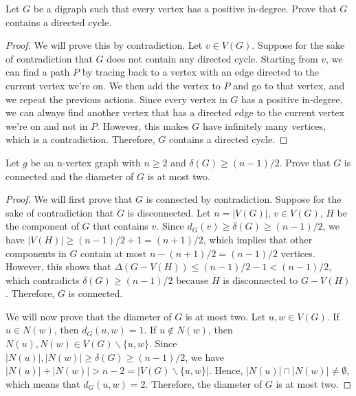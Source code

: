 \documentclass{article}
\newenvironment{problem}[2][Problem]{\begin{trivlist}
\item[\hskip \labelsep {\bfseries #1}\hskip \labelsep {\bfseries #2.}]}{\end{trivlist}}
\begin{document}
\begin{problem}{1.7.4}
    Let $G$ be a digraph such that every vertex has a positive in-degree. Prove that $G$ contains a directed cycle.
\end{problem}
\begin{proof}
    We will prove this by contradiction. Let $v \in V(G)$.  Suppose for the sake of contradiction that $G$ does not contain any directed cycle. Starting from $v$, we can find a path $P$ by tracing back to a vertex with an edge directed to the current vertex we're on. We then add the vertex to $P$ and go to that vertex, and we repeat the previous actions. Since every vertex in $G$ has a positive in-degree, we can always find another vertex that has a directed edge to the current vertex we're on and not in $P$. However, this makes $G$ have infinitely many vertices, which is a contradiction. Therefore, $G$ contains a directed cycle.
\end{proof}

\begin{problem}{1.7.12}
 Let $g$ be an n-vertex graph with $n \geq 2$ and $\delta(G) \geq (n-1)/2$. Prove that $G$ is connected and the diameter of $G$ is at most two.
\end{problem}
\begin{proof}
    We will first prove that $G$ is connected by contradiction. Suppose for the sake of contradiction that $G$ is disconnected. Let $n = |V(G)|$, $v \in V(G)$, $H$ be the component of $G$ that contains $v$. Since $d_G(v) \geq \delta(G) \geq (n-1)/2$, we have $|V(H)| \geq (n-1)/2 + 1 = (n+1)/2$, which implies that other components in $G$ contain at most $n - (n+1)/2 = (n-1)/2$ vertices. However, this shows that $\Delta(G-V(H)) \leq (n-1)/2 - 1 < (n-1)/2$, which contradicts $\delta(G) \geq (n-1)/2$ because $H$ is disconnected to $G-V(H)$. Therefore, $G$ is connected.

    We will now prove that the diameter of $G$ is at most two. Let $u, w \in V(G)$. If $u \in N(w)$, then $d_G(u, w) = 1$. If $u \notin N(w)$, then $N(u), N(w) \in V(G) \backslash \{u, w\}$. Since $|N(u)|, |N(w)| \geq \delta(G) \geq (n-1)/2$, we have $|N(u)| + |N(w)| > n - 2 = |V(G) \backslash \{u, w\}|$. Hence, $|N(u)| \cap |N(w)| \neq \emptyset$, which means that $d_G(u, w) = 2$. Therefore, the diameter of $G$ is at most two.
\end{proof}
\end{document}
